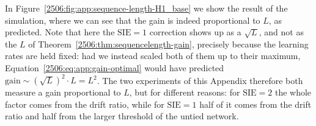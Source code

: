 In Figure~\ref{2506:fig:app:sequence-length-H1_base} we show the result of the simulation, where we can see that the gain is indeed proportional to \(L\), as predicted. Note that here the \(\mathrm{SIE}=1\) correction shows up as a \(\sqrt{L}\), and not as the \(L\) of Theorem~\ref{2506:thm:sequencelength-gain}, precisely because the learning rates are held fixed: had we instead scaled both of them up to their maximum, Equation~\eqref{2506:eq:app:gain-optimal} would have predicted \(\mathrm{gain} \sim (\sqrt{L})^2 \cdot L = L^2\). The two experiments of this Appendix therefore both measure a gain proportional to \(L\), but for different reasons: for \(\mathrm{SIE}=2\) the whole factor comes from the drift ratio, while for \(\mathrm{SIE}=1\) half of it comes from the drift ratio and half from the larger threshold of the untied network.

